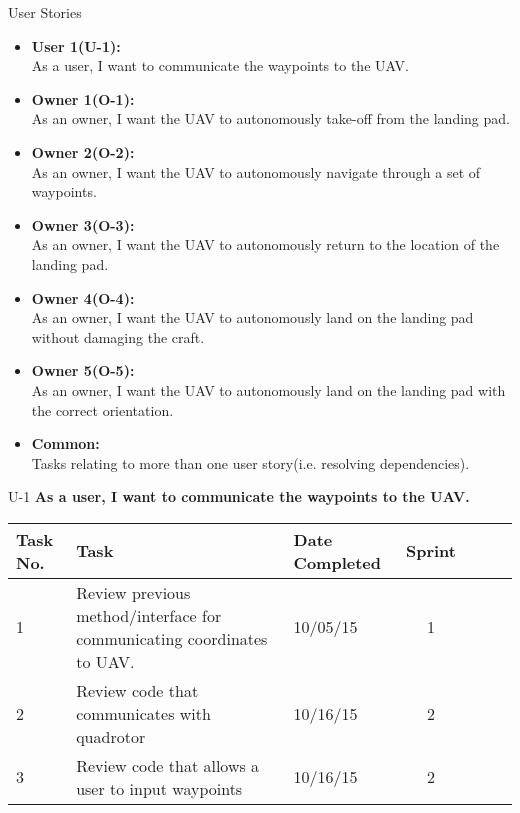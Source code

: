 \documentclass[11pt]{beamer}
\begin{document}
\begin{frame}{User Stories}

\begin{itemize}
\item \textbf{User 1(U-1):}\\ As a user, I want to communicate the waypoints to the UAV.
\item \textbf{Owner 1(O-1):}\\ As an owner, I want the UAV to autonomously take-off from the landing pad.
\item \textbf{Owner 2(O-2):}\\ As an owner, I want the UAV to autonomously navigate through a set of waypoints.
\item \textbf{Owner 3(O-3):}\\ As an owner, I want the UAV to autonomously return to the location of the landing pad.
\item \textbf{Owner 4(O-4):}\\ As an owner, I want the UAV to autonomously land on the landing pad without damaging the craft.
\item \textbf{Owner 5(O-5):}\\ As an owner, I want the UAV to autonomously land on the landing pad with the correct orientation.
\item \textbf{Common:}\\ Tasks relating to more than one user story(i.e. resolving dependencies).
\end{itemize}

\end{frame}

\begin{frame}{U-1}
\textbf{As a user, I want to communicate the waypoints to the UAV.}
\begin{tabular}{| p{1cm} | lp{2cm} | cp{2cm} | cp{1cm} |}\hline
Task No. & Task & Date Completed & Sprint\\\hline
1 & Review previous method/interface for communicating coordinates to UAV. & 10/05/15 & 1 \\\hline
2 & Review code that communicates with quadrotor & 10/16/15 & 2 \\\hline
3 & Review code that allows a user to input waypoints & 10/16/15 & 2\\\hline

\end{tabular}
\end{frame}
\end{document}
